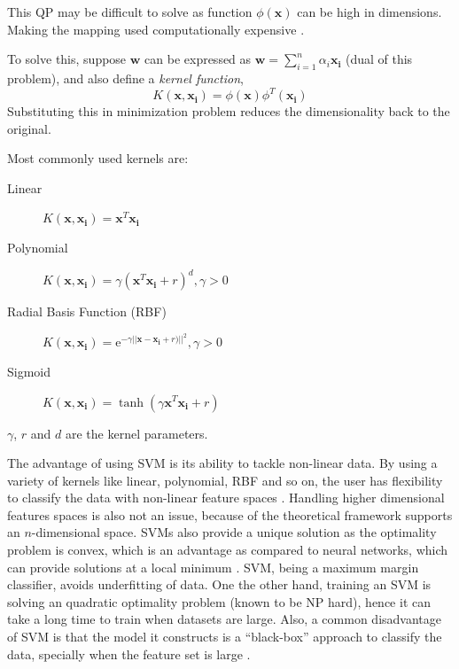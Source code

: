 This QP may be difficult to solve as function $\phi(\boldsymbol{x})$ can be high in dimensions. Making the mapping used computationally expensive \cite{Ben-Hur2010}.

To solve this, suppose $\boldsymbol{w}$ can be expressed as $\boldsymbol{w} = \sum\limits_{i=1}^n \alpha_i\boldsymbol{x_i}$ (dual of this problem), and also define a \emph{kernel function},
\[K(\boldsymbol{x},\boldsymbol{x_i}) = \phi(\boldsymbol{x})\phi^T(\boldsymbol{x_i})\]
 Substituting this in minimization problem reduces the dimensionality back to the original.

Most commonly used kernels are:
\begin{description}
  \item[Linear] $K(\boldsymbol{x},\boldsymbol{x_i}) = \boldsymbol{x}^T\boldsymbol{x_i}$
  \item[Polynomial] $K(\boldsymbol{x},\boldsymbol{x_i}) = \gamma(\boldsymbol{x}^T\boldsymbol{x_i}+r)^d, \gamma > 0$
  \item[Radial Basis Function (RBF)] $K(\boldsymbol{x},\boldsymbol{x_i}) = \mathrm{e}^{-\gamma||\boldsymbol{x}-\boldsymbol{x_i}+r)||^2}, \gamma > 0$
  \item[Sigmoid] $K(\boldsymbol{x},\boldsymbol{x_i}) = \tanh(\gamma\boldsymbol{x}^T\boldsymbol{x_i}+r)$
\end{description}

$\gamma$, $r$ and $d$ are the kernel parameters.

The advantage of using SVM is its ability to tackle non-linear data. By using a variety of kernels like linear, polynomial, RBF and so on, the user has flexibility to classify the data with non-linear feature spaces \cite {Chang2011}. Handling higher dimensional features spaces is also not an issue, because of the theoretical framework \cite{Vapnik1995} supports an $n$-dimensional space. SVMs also provide a unique solution as the optimality problem is convex, which is an advantage as compared to neural networks, which can provide solutions at a local minimum \cite{Auria2008}. SVM, being a maximum margin classifier, avoids underfitting of data. One the other hand, training an SVM is solving an quadratic optimality problem (known to be NP hard), hence it can take a long time to train when datasets are large. Also, a common disadvantage of SVM is that the model it constructs is a \enquote{black-box} approach to classify the data, specially when the feature set is large \cite{Auria2008}.

